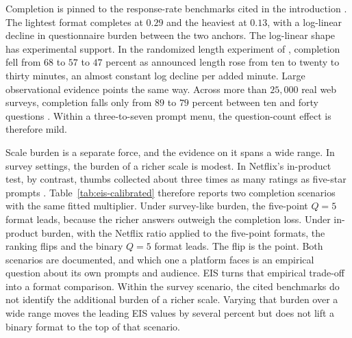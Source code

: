 \documentclass[11pt]{article}
\theoremstyle{definition}
\theoremstyle{remark}
\newcommand{\1}{\mathbf{1}}
\begin{document}
Completion is pinned to the response-rate benchmarks cited in the introduction
\citep{Malnik2025}. The lightest format completes at \(0.29\) and the
heaviest at \(0.13\), with a log-linear decline in questionnaire burden
between the two anchors. The log-linear shape has experimental support.
In the randomized length experiment of \citet{Galesic2009}, completion
fell from \(68\) to \(57\) to \(47\) percent as announced length rose
from ten to twenty to thirty minutes, an almost constant log decline
per added minute. Large observational evidence points the same way. Across more than \(25{,}000\) real web surveys, completion falls only
from \(89\) to \(79\) percent between ten and forty questions
\citep{LiuWronski2018,SurveyMonkeyCompletion2020}. Within a three-to-seven prompt menu, the
question-count effect is therefore mild.

Scale burden is a separate force, and the evidence on it spans a wide
range. In survey settings, the burden of a richer scale is modest. In Netflix's in-product test, by contrast, thumbs collected about three
times as many ratings as five-star prompts \citep{Netflix2017}.
Table~\ref{tab:eis-calibrated} therefore reports two completion
scenarios with the same fitted multiplier. Under survey-like burden,
the five-point \(Q{=}5\) format leads, because the richer answers
outweigh the completion loss. Under in-product burden, with the Netflix ratio
applied to the five-point formats, the ranking flips and the binary
\(Q{=}5\) format leads. The flip is the point. Both scenarios are
documented, and which one a platform faces is an empirical question
about its own prompts and audience. EIS turns that empirical trade-off
into a format comparison. Within the survey scenario, the cited
benchmarks do not identify the additional burden of a richer scale.
Varying that burden over a wide range moves the leading EIS values by
several percent but does not lift a binary format to the top of that
scenario.
\end{document}
